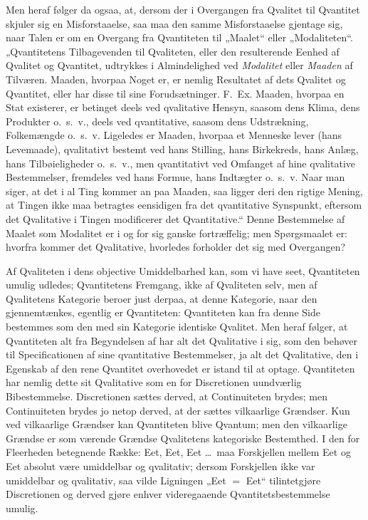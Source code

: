 \documentclass[12pt]{book}
\newcommand{\opage}[1]{\marginnote{\footnotesize\textit{[#1]}}}
\begin{document}
Men heraf følger da ogsaa, at, dersom der i Overgangen fra Qvalitet til Qvantitet skjuler sig en
Misforstaaelse, saa maa den samme Misforstaaelse gjentage sig, naar Talen er om en Overgang fra
Qvantiteten til „Maalet“ eller „Modaliteten“. „Qvantitetens Tilbagevenden til Qvaliteten, eller den
resulterende Eenhed af Qvalitet og Qvantitet, udtrykkes i Almindelighed ved \emph{Modalitet} eller
\emph{Maaden} af Tilværen. Maaden, hvorpaa Noget er, er nemlig Resultatet af dets Qvalitet og Qvantitet,
eller har disse til sine Forudsætninger. F.\ Ex. Maaden, hvorpaa en Stat existerer, er betinget deels
ved qvalitative Hensyn, saasom dens Klima, dens Produkter o.\ s.\ v., deels ved qvantitative, saasom
dens Udstrækning, Folkemængde o.\ s.\ v. Ligeledes er Maaden, hvorpaa et Menneske lever (hans
Levemaade), qvalitativt bestemt ved hans Stilling, hans Birkekreds, hans Anlæg, hans Tilbøieligheder
o.\ s.\ v., men qvantitativt ved Omfanget af hine qvalitative Bestemmelser, fremdeles ved hans Formue,
hans Indtægter o.\ s.\ v. Naar man siger, at det i al Ting kommer an paa Maaden, saa ligger deri den
rigtige Mening, at Tingen ikke maa betragtes eensidigen fra det qvantitative Synspunkt, eftersom det
Qvalitative i Tingen modificerer det Qvantitative.“ Denne Bestemmelse af Maalet som Modalitet er i og
for sig ganske
\opage{303} fortræffelig; men Spørgsmaalet er: hvorfra kommer det Qvalitative, hvorledes forholder det sig med
Overgangen?

Af Qvaliteten i dens objective Umiddelbarhed kan, som vi have seet, Qvantiteten umulig udledes;
Qvantitetens Fremgang, ikke af Qvaliteten selv, men af Qvalitetens Kategorie beroer just derpaa, at
denne Kategorie, naar den gjennemtænkes, egentlig er Qvantiteten: Qvantiteten kan fra denne Side
bestemmes som den med sin Kategorie identiske Qvalitet. Men heraf følger, at Qvantiteten alt fra
Begyndelsen af har alt det Qvalitative i sig, som den behøver til Specificationen af sine qvantitative
Bestemmelser, ja alt det Qvalitative, den i Egenskab af den rene Qvantitet overhovedet er istand til at
optage. Qvantiteten har nemlig dette sit Qvalitative som en for Discretionen uundværlig Bibestemmelse.
Discretionen sættes derved, at Continuiteten brydes; men Continuiteten brydes jo netop derved, at der
sættes vilkaarlige Grændser. Kun ved vilkaarlige Grændser kan Qvantiteten blive Qvantum; men den
vilkaarlige Grændse er som værende Grændse Qvalitetens kategoriske Bestemthed. I den for Fleerheden
betegnende Række: Eet, Eet, Eet \ldots\ maa Forskjellen mellem Eet og Eet absolut være umiddelbar og
qvalitativ; dersom Forskjellen ikke var umiddelbar og qvalitativ, saa vilde Ligningen „Eet $=$ Eet“
tilintetgjøre Discretionen og derved gjøre enhver videregaaende Qvantitetsbestemmelse umulig.
\end{document}
